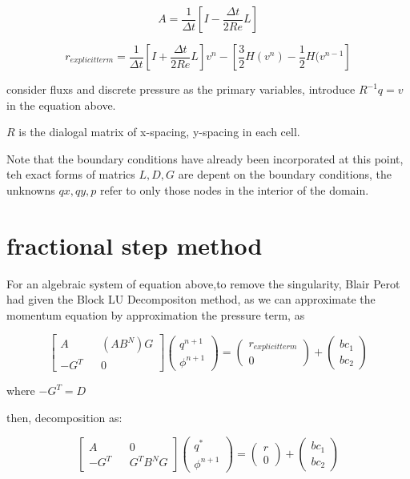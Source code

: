 \documentclass[11pt]{article}
\begin{document}
$$ A = \frac{1}{\Delta t} [ I - \frac{\Delta t}{2Re}L] $$

$$ r_{explicit term} = \frac{1}{\Delta t} [ I + \frac{\Delta t}{2Re} L] v^n - [\frac{3}{2} H(v^n) - \frac{1}{2} H(v^{n-1}] $$

consider fluxs and discrete pressure as the primary variables, introduce $ R^{-1}q = v $ in the equation above.

$R$ is the dialogal matrix of x-spacing, y-spacing in each cell.

Note that the boundary conditions have already been incorporated at this point, teh exact forms of matrics $L, D, G$ are depent on the boundary conditions, the unknowns $qx, qy, p$ refer to only those nodes in the interior of the domain.

\section{fractional step method}

For an algebraic system of equation above,to remove the singularity,  Blair Perot had given the Block LU Decompositon method, as we can approximate the momentum equation by approximation the pressure term, as 

 $$ 
\begin{bmatrix} A &&  (AB^N)G \\ -G^T &&  0 \end{bmatrix} \begin{pmatrix} q^{n+1} \\ \phi ^{n+1} \end{pmatrix} = \left( \begin{array}{c} r_{explicit term} \\ 0 \end{array} \right) + \left ( \begin{array}{c} bc_1 \\ bc_2 \end{array} \right) $$

where $ -G^T = D$

then, decomposition as:

$$ 
\begin{bmatrix} A && 0 \\ -G^T && G^TB^NG \end{bmatrix} \begin{pmatrix} q^* \\ \phi ^{n+1} \end{pmatrix} = \left( \begin{array}{c} r \\ 0 \end{array} \right) + \left ( \begin{array}{c} bc_1 \\ bc_2 \end{array} \right) $$
\end{document}
